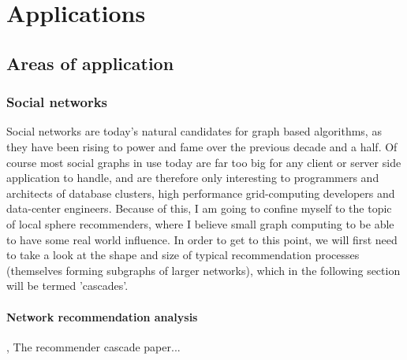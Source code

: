 \chapter{Applications}
\label{ch:applications}


\section{Areas of application}
\label{sect:app_areas}

	\subsection{Social networks}
	\label{ssect:social_networks}
	
	Social networks are today's natural candidates for graph based algorithms, as they have been rising to power and fame over the previous decade and a half. Of course most social graphs in use today are far too big for any client or server side application to handle, and are therefore only interesting to programmers and architects of database clusters, high performance grid-computing developers and data-center engineers. Because of this, I am going to confine myself to the topic of local sphere recommenders, where I believe small graph computing to be able to have some real world influence. In order to get to this point, we will first need to take a look at the shape and size of typical recommendation processes (themselves forming subgraphs of larger networks), which in the following section will be termed 'cascades'.
	
	\subsubsection{Network recommendation analysis}
	\label{sssect:net_rec_anal}
	
	\citet{RecCascades}, The recommender cascade paper...
	
